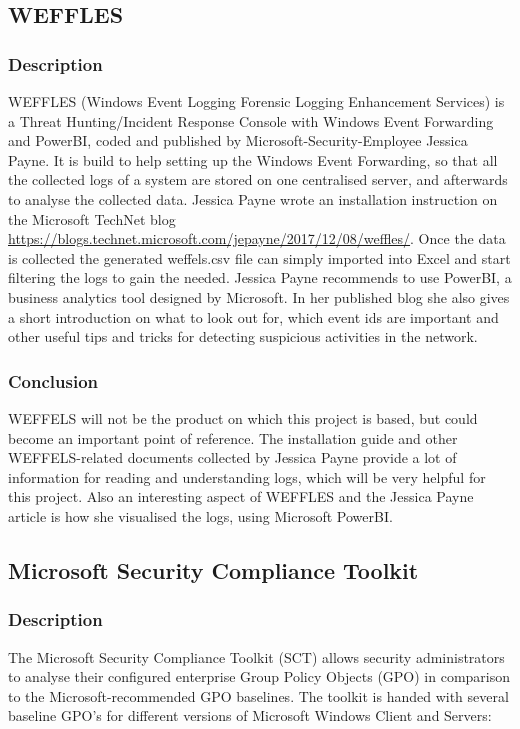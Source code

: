 \subsection{WEFFLES}
\subsubsection{Description}
WEFFLES (Windows Event Logging Forensic Logging Enhancement Services) is a Threat Hunting/Incident Response Console with Windows Event Forwarding and PowerBI, coded and published by Microsoft-Security-Employee Jessica Payne. It is build to help setting up the Windows Event Forwarding, so that all the collected logs of a system are stored on one centralised server, and afterwards to analyse the collected data. Jessica Payne wrote an installation instruction on the Microsoft TechNet blog \url{https://blogs.technet.microsoft.com/jepayne/2017/12/08/weffles/}. Once the data is collected  the generated weffels.csv file can simply imported into Excel and start filtering the logs to gain the needed. Jessica Payne recommends to use PowerBI, a business analytics tool designed by Microsoft. In her published blog she also gives a short introduction on what to look out for, which event ids are important and other useful tips and tricks for detecting suspicious activities in the network.
\subsubsection{Conclusion}
WEFFELS will not be the product on which this project is based, but could become an important point of reference. The installation guide and other WEFFELS-related documents collected by Jessica Payne provide a lot of information for reading and understanding logs, which will be very helpful for this project. Also an interesting aspect of WEFFLES and the Jessica Payne article is how she visualised the logs, using Microsoft PowerBI.


\subsection{Microsoft Security Compliance Toolkit}
\subsubsection{Description}
The Microsoft Security Compliance Toolkit (SCT) \cite{SCT} allows security administrators to analyse their configured enterprise Group Policy Objects (GPO) in comparison to the Microsoft-recommended GPO baselines. The toolkit is handed with several baseline GPO's for different versions of Microsoft Windows Client and Servers:

